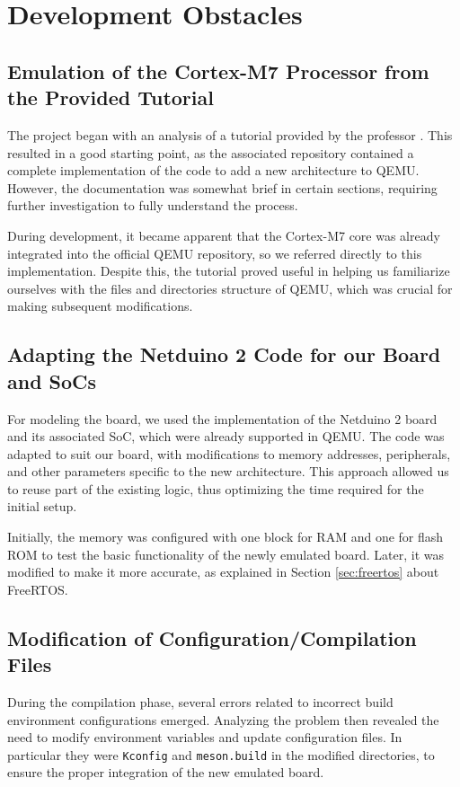 \section{Development Obstacles}

\subsection{Emulation of the Cortex-M7 Processor from the Provided Tutorial}
The project began with an analysis of a tutorial provided by the professor \cite{Goehler_QEMU_Architecture}. This resulted in a good starting point, as the associated repository contained a complete implementation of the code to add a new architecture to QEMU. However, the documentation was somewhat brief in certain sections, requiring further investigation to fully understand the process.

During development, it became apparent that the Cortex-M7 core was already integrated into the official QEMU repository, so we referred directly to this implementation. Despite this, the tutorial proved useful in helping us familiarize ourselves with the files and directories structure of QEMU, which was crucial for making subsequent modifications.


\subsection{Adapting the Netduino 2 Code for our Board and SoCs}
For modeling the board, we used the implementation of the Netduino 2 board and its associated SoC, which were already supported in QEMU. The code was adapted to suit our board, with modifications to memory addresses, peripherals, and other parameters specific to the new architecture. This approach allowed us to reuse part of the existing logic, thus optimizing the time required for the initial setup.

Initially, the memory was configured with one block for RAM and one for flash ROM to test the basic functionality of the newly emulated board. Later, it was modified to make it more accurate, as explained in Section \ref{sec:freertos} about FreeRTOS.


\subsection{Modification of Configuration/Compilation Files}
During the compilation phase, several errors related to incorrect build environment configurations emerged. Analyzing the problem then revealed the need to modify environment variables and update configuration files. In particular they were \texttt{Kconfig} and \texttt{meson.build} in the modified directories, to ensure the proper integration of the new emulated board.

